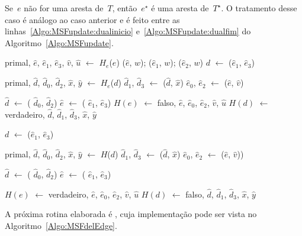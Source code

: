Se~$e$ não for uma aresta de~$T$, então~$e^\star$ é uma aresta de~$T^\star$.
O tratamento desse caso é análogo ao caso anterior e é feito entre as linhas~\ref{Algo:MSFupdate:dualinicio} e~\ref{Algo:MSFupdate:dualfim} do Algoritmo~\ref{Algo:MSFupdate}.

\begin{algorithm}[htb]
\caption{\MSFupdate($G$, $e$, $w$)}
\label{Algo:MSFupdate}
\begin{algorithmic}[1]
\State primal, $\hat e$, $\hat e_1$, $\hat e_3$, $\hat v$, $\hat u$ $\gets$ $H_e$($e$)
\State \LCOAddCost($\hat e$, $w$); \LCOAddCost($\hat e_1$, $w$); \LCOAddCost($\hat e_2$, $w$)
\State $d$ $\gets$ \LCOMin($\hat e_1$, $\hat e_3$)\label{Algo:MSFupdate:linhamin}

\State primal, $\hat d$, $\hat d_0$, $\hat d_2$, $\hat x$, $\hat y$ $\gets$ $H_e$($d$)
\State $\hat d_1$, $\hat d_3$ $\gets$ \LCOSplit($\hat d$, $\hat x$)\label{Algo:MSFupdate:linhasplitd}
\State $\hat e_0$, $\hat e_2$ $\gets$ \LCOSplit($\hat e$, $\hat v$)\label{Algo:MSFupdate:linhasplite}


\State $\hat d$ $\gets$ \LCOMerge( $\hat d_0$, $\hat d_2$)\label{Algo:MSFupdate:linhas:Merged}
\State $\hat e$ $\gets$ \LCOMerge( $\hat e_1$, $\hat e_3$)\label{Algo:MSFupdate:linhas:Mergee}
\State $H(e)$ $\gets$ falso, $\hat e$, $\hat e_0$, $\hat e_2$, $\hat v$, $\hat u$
\State $H(d)$ $\gets$ verdadeiro, $\hat d$, $\hat d_1$, $\hat d_3$, $\hat x$, $\hat y$

\EndIf

\Else
\State $d$ $\gets$ \LCOMax($\hat e_1$, $\hat e_3$)\label{Algo:MSFupdate:dualinicio}

\State primal, $\hat d$, $\hat d_0$, $\hat d_2$, $\hat x$, $\hat y$ $\gets$ $H$($d$)
\State $\hat d_1$, $\hat d_3$ $\gets$ \LCOSplit($\hat d$, $\hat x$)
\State $\hat e_0$, $\hat e_2$ $\gets$ \LCOSplit($\hat e$, $\hat v$))

\State $\hat d$ $\gets$ \LCOMerge( $\hat d_0$, $\hat d_2$)
\State $\hat e$ $\gets$ \LCOMerge( $\hat e_1$, $\hat e_3$)

\State $H(e)$ $\gets$ verdadeiro, $\hat e$, $\hat e_0$, $\hat e_2$, $\hat v$, $\hat u$
\State $H(d)$ $\gets$ falso, $\hat d$, $\hat d_1$, $\hat d_3$, $\hat x$, $\hat y$

\EndIf
\EndIf\label{Algo:MSFupdate:dualfim}
\end{algorithmic}
\end{algorithm}


A próxima rotina elaborada é \MSFdelEdge{}, cuja implementação pode ser vista no Algoritmo~\ref{Algo:MSFdelEdge}.

